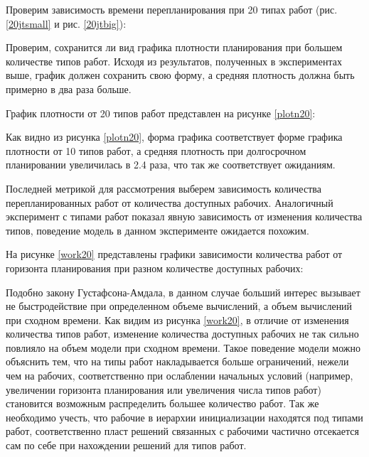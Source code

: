 Проверим зависимость времени перепланирования при 20 типах работ (рис. \ref{20jtsmall} и рис. \ref{20jtbig}):



Проверим, сохранится ли вид графика плотности планирования при большем количестве типов работ. Исходя из результатов, полученных в экспериментах выше, график должен сохранить свою форму, а средняя плотность должна быть примерно в два раза больше.

График плотности от 20 типов работ представлен на рисунке \ref{plotn20}:


Как видно из рисунка \ref{plotn20}, форма графика соответствует форме графика плотности от 10 типов работ, а средняя плотность при долгосрочном планировании увеличилась в 2.4 раза, что так же соответствует ожиданиям.

Последней метрикой для рассмотрения выберем зависимость количества перепланированных работ от количества доступных рабочих. Аналогичный эксперимент с типами работ показал явную зависимость от изменения количества типов, поведение модель в данном эксперименте ожидается похожим.

На рисунке \ref{work20} представлены графики зависимости количества работ от горизонта планирования при разном количестве доступных рабочих:


Подобно закону Густафсона-Амдала, в данном случае больший интерес вызывает не быстродействие при определенном объеме вычислений, а объем вычислений при сходном времени. Как видим из рисунка \ref{work20}, в отличие от изменения количества типов работ, изменение количества доступных рабочих не так сильно повлияло на объем модели при сходном времени. Такое поведение модели можно объяснить тем, что на типы работ накладывается больше ограничений, нежели чем на рабочих, соответственно при ослаблении начальных условий (например, увеличении горизонта планирования или увеличения числа типов работ) становится возможным распределить большее количество работ. Так же необходимо учесть, что рабочие в иерархии инициализации находятся под типами работ, соответственно пласт решений связанных с рабочими частично отсекается сам по себе при нахождении решений для типов работ.

